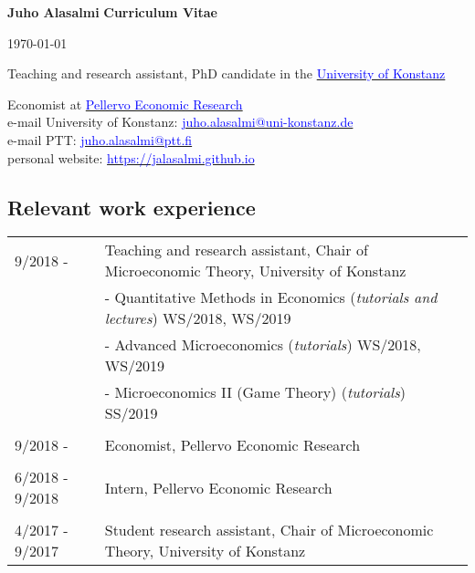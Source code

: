 \documentclass[16pt]{article}
\begin{document}
\noindent \textbf{Juho Alasalmi} \hfill{\textbf{Curriculum Vitae}} \par
\noindent  \hfill{\today} \par
\noindent Teaching and research assistant, PhD candidate in the \href{https://www.wiwi.uni-konstanz.de/goldluecke/team/academic-staff/doctoral-students/}{\textcolor{blue}{University of Konstanz}} \par
\noindent Economist at \href{http://www.ptt.fi/}{\textcolor{blue}{Pellervo Economic Research}} \\

\noindent e-mail University of Konstanz: \href{mailto: juho.alasalmi@uni-konstanz.de}{\textcolor{blue}{juho.alasalmi@uni-konstanz.de}} \\
\noindent e-mail PTT: \href{mailto: juho.alasalmi@ptt.fi}{\textcolor{blue}{juho.alasalmi@ptt.fi}}\\
\noindent personal website: \href{https://jalasalmi.github.io}{\textcolor{blue}{https://jalasalmi.github.io}}

\subsection*{Relevant work experience}
\begin{tabular}{@{}p{1.5in}p{5in}}
9/2018 -            & Teaching and research assistant, Chair of Microeconomic Theory,  University of Konstanz \\
                          &   -  Quantitative Methods in Economics (\textit{tutorials and lectures}) WS/2018, WS/2019  \\
                          &   -  Advanced Microeconomics (\textit{tutorials}) WS/2018, WS/2019 \\   
                          &   -  Microeconomics II (Game Theory) (\textit{tutorials}) SS/2019 \\   
                                                 
\\
9/2018 -            & Economist, Pellervo Economic Research\\

\\
6/2018 - 9/2018 & Intern, Pellervo Economic Research\\

\\
4/2017 - 9/2017 & Student research assistant, Chair of Microeconomic Theory,  University of Konstanz\\
                           
\end{tabular}
\end{document}
